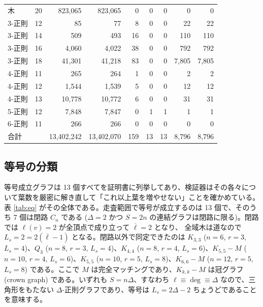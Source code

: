 \documentclass[paper=a4,fontsize=10.5pt,jafontsize=10.5pt]{jlreq}
\theoremstyle{plain}
\theoremstyle{definition}
\begin{document}
\begin{table}[t]
\begin{tabular}{lrrrrrrrr}
木 & 20 & 823,065 & 823,065 & 0 & 0 & 0 & 0 & 0 \\
3-正則 & 12 & 85 & 77 & 8 & 0 & 0 & 22 & 22 \\
3-正則 & 14 & 509 & 493 & 16 & 0 & 0 & 110 & 110 \\
3-正則 & 16 & 4,060 & 4,022 & 38 & 0 & 0 & 792 & 792 \\
3-正則 & 18 & 41,301 & 41,218 & 83 & 0 & 0 & 7,805 & 7,805 \\
4-正則 & 11 & 265 & 264 & 1 & 0 & 0 & 2 & 2 \\
4-正則 & 12 & 1,544 & 1,539 & 5 & 0 & 0 & 12 & 12 \\
4-正則 & 13 & 10,778 & 10,772 & 6 & 0 & 0 & 31 & 31 \\
5-正則 & 12 & 7,848 & 7,847 & 0 & 1 & 1 & 1 & 1 \\
6-正則 & 11 & 266 & 266 & 0 & 0 & 0 & 0 & 0 \\
\midrule
合計 & & 13,402,242 & 13,402,070 & 159 &
13 & 13 & 8,796 & 8,796 \\
\bottomrule
\end{tabular}
\end{table}

\subsection*{等号の分類}

等号成立グラフは 13 個すべてを証明書に列挙してあり、検証器はその各々について葉数を厳密に解き直して「これ以上葉を増やせない」ことを確かめている。表 \ref{tab:eq} がその全体である。走査範囲で等号が成立するのは
13 個で、そのうち 7 個は閉路 $C_n$ である
($\Delta = 2$ かつ $S = 2n$ の連結グラフは閉路に限る)。閉路では
$\ell(v) = 2$ が全頂点で成り立って $\overline{\ell} = 2$ となり、
全域木は道なので $L_s = 2 = 2(\overline{\ell} - 1)$ となる。閉路以外で同定できたのは $K_{3,3}$ ($n = 6$, $r = 3$, $L_s = 4$)、$Q_3$ ($n = 8$, $r = 3$, $L_s = 4$)、$K_{4,4}$ ($n = 8$, $r = 4$, $L_s = 6$)、$K_{5,5} - M$ ($n = 10$, $r = 4$, $L_s = 6$)、$K_{5,5}$ ($n = 10$, $r = 5$, $L_s = 8$)、$K_{6,6} - M$ ($n = 12$, $r = 5$, $L_s = 8$) である。ここで $M$ は完全マッチングであり、$K_{k,k} - M$ は冠グラフ (crown graph) である。いずれも $S = n\Delta$、すなわち $\ell \equiv \deg \equiv \Delta$ なので、三角形をもたない $\Delta$-正則グラフであり、等号は $L_s = 2\Delta - 2$ ちょうどであることを意味する。
\end{document}

